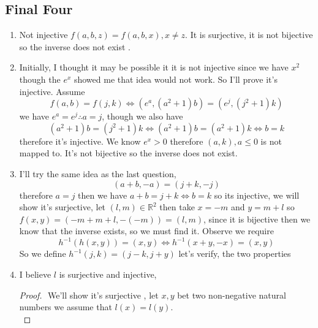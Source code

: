 \documentclass[11pt]{book}
\begin{document}
\subsection{Final Four}%
\label{sub:final_four}

\begin{enumerate}
    \item Not injective $f\left(a,b,z\right) = f\left(a,b,x\right) ,x\neq z $. It is surjective, it is not bijective so the inverse does not exist .
    \item Initially, I thought it may be possible it it is not injective since we have $x^2 $ though the $e^{x} $ showed me that idea would not work. So I'll prove it's injective. Assume 
        \[
            f\left(a,b\right) = f\left( j,k \right) \Leftrightarrow \left( e^{a} , \left( a^2  + 1 \right) b \right) = \left( e^{j} ,\left( j^2  + 1 \right) k \right) 
        \]
        we have $e^{a} = e^{j} \therefore a = j $, though we also have
        \[
            \left( a^2  + 1 \right) b = \left( j^2  + 1 \right) k \Leftrightarrow \left( a^2  + 1 \right) b= \left( a^2  + 1 \right) k \Leftrightarrow b= k
        \]
        therefore it's injective. We know $e^{x} > 0$ therefore $\left( a,k \right), a \le 0$ is not mapped to. It's not bijective so the inverse does not exist.
    \item I'll try the same idea as the last question, 
        \[
            \left( a + b,  - a \right) = \left( j + k,  - j \right) 
        \]
        therefore $a = j$ then we have $a + b= j + k \Leftrightarrow b= k$ so its injective, we will show it's surjective, let $\left( l,m \right) \in \mathbb{R} ^2 $ then take $x=  - m$ and $y= m + l$ so $f\left(x,y\right) = \left(  - m  + m + l,  - \left(  - m \right)  \right) = \left( l,m \right) $, since it is bijective then we know that the inverse exists, so we must find it. Observe we require
        \[
            h^{-1} \left( h\left(x, y\right)  \right) =  \left( x,y \right) \Leftrightarrow h^{-1} \left(x + y,  - x\right) = \left( x,y \right) 
        \]
        So we define $h^{-1}\left( j, k \right) = \left( j - k, j + y \right)  $ let's verify, the two properties 
    \item I believe $l$ is surjective and injective, 
        \begin{proof}
        $ $\newline
        We'll show it's surjective , let $x,y$ bet two non-negative natural numbers we assume that $l\left(x\right) = l\left(y\right) $.\\

\end{proof}
\end{enumerate}
\end{document}
